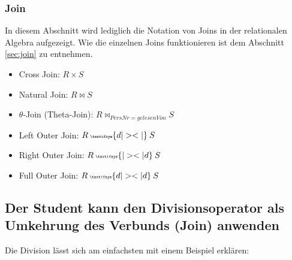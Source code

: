 \subsubsection{Join}

In diesem Abschnitt wird lediglich die Notation von Joins in der relationalen Algebra aufgezeigt. Wie die einzelnen Joins funktionieren ist dem Abschnitt \ref{sec:join} zu entnehmen.

\begin{itemize}
	\item Cross Join: $R \times S$
	\item Natural Join: $R \bowtie S$
	\item $\theta$-Join (Theta-Join): $R \bowtie_{PersNr=gelesenVon} S$
	\item Left Outer Join: $R \: {\tiny \textifsym{d|><|}} \: S$
	\item Right Outer Join: $R \: {\tiny \textifsym{|><|d}} \: S$
	\item Full Outer Join: $R \: {\tiny \textifsym{d|><|d}} \: S$
\end{itemize}

\subsection{Der Student kann den Divisionsoperator als Umkehrung des Verbunds (Join) anwenden}

Die Division lässt sich am einfachsten mit einem Beispiel erklären:


